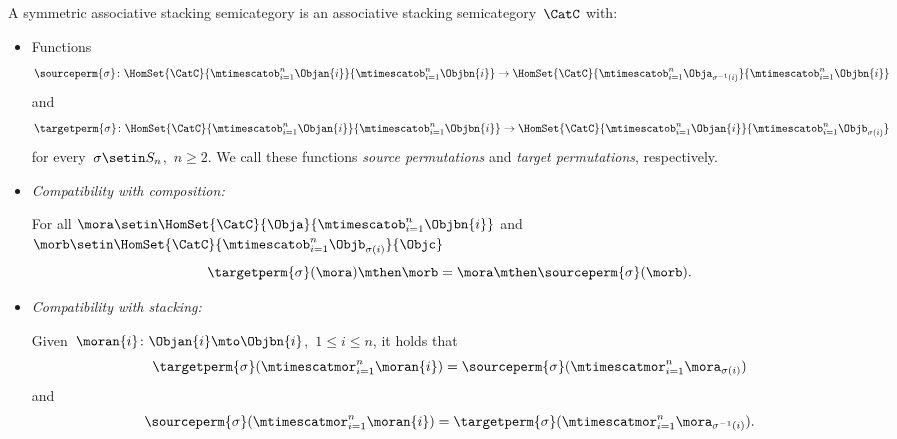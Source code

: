 \begin{ctdefinition}
    \label{def:symmetric-stacking-category}
    A symmetric associative stacking semicategory is an associative stacking semicategory~$\CatC$ with:

    \constit

    \begin{itemize}
        \item Functions
              \begin{equation}
                  \sourceperm{\sigma} \colon \HomSet{\CatC}{\mtimescatob_{i=1}^n \Objan{i}}{\mtimescatob_{i=1}^n \Objbn{i}} \to \HomSet{\CatC}{\mtimescatob_{i=1}^n \Obja_{\sigma^{-1}(i)}}{\mtimescatob_{i=1}^n \Objbn{i}}
              \end{equation}
              and
              \begin{equation}
                  \targetperm{\sigma} \colon \HomSet{\CatC}{\mtimescatob_{i=1}^n \Objan{i}}{\mtimescatob_{i=1}^n \Objbn{i}} \to \HomSet{\CatC}{\mtimescatob_{i=1}^n \Objan{i}}{\mtimescatob_{i=1}^n \Objb_{\sigma(i)}}
              \end{equation}
              for every~$\sigma \setin S_n$,~$n \geq 2$.
              We call these functions \emph{source permutations} and \emph{target permutations}, respectively.
    \end{itemize}

    \condit

    \begin{itemize}

        \item \emph{Compatibility with composition:}

              For all $\mora \setin \HomSet{\CatC}{\Obja}{\mtimescatob_{i=1}^n \Objbn{i}}$ and $\morb \setin \HomSet{\CatC}{\mtimescatob_{i=1}^n \Objb_{\sigma(i)}}{\Objc}$
              \begin{equation}
                  \targetperm{\sigma} (\mora) \mthen \morb = \mora \mthen \sourceperm{\sigma}(\morb).
              \end{equation}

        \item \emph{Compatibility with stacking:}

              Given~$\moran{i} \colon \Objan{i} \mto \Objbn{i}$,~$1 \leq i \leq n$, it holds that
              \begin{equation}
                  \targetperm{\sigma} ( \mtimescatmor_{i=1}^n \moran{i} ) = \sourceperm{\sigma}(  \mtimescatmor_{i=1}^n \mora_{\sigma(i)} )
              \end{equation}
              and
              \begin{equation}
                  \sourceperm{\sigma} ( \mtimescatmor_{i=1}^n \moran{i} ) = \targetperm{\sigma} (  \mtimescatmor_{i=1}^n \mora_{\sigma^{-1}(i)} ).
              \end{equation}


\end{itemize}
\end{ctdefinition}
